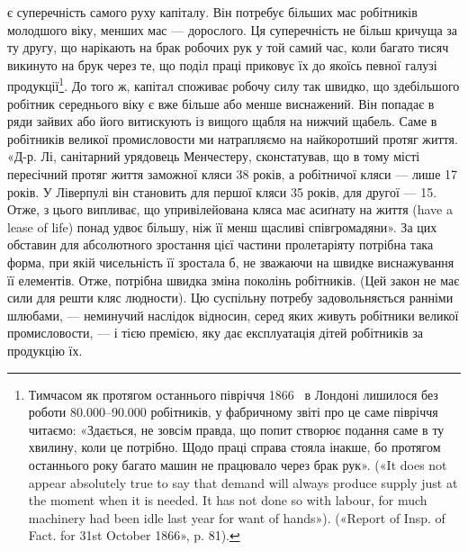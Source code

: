 \parcont{}  %
є суперечність самого руху капіталу. Він потребує більших мас робітників молодшого віку, менших мас
— дорослого. Ця суперечність не більш кричуща за ту другу, що нарікають на брак робочих рук у той
самий час, коли багато тисяч викинуто на
брук через те, що поділ праці приковує їх до якоїсь певної галузі продукції\footnote{
Тимчасом як протягом останнього півріччя 1866~ в Лондоні лишилося без роботи \num{80.000}--\num{90.000}
робітників, у фабричному звіті про це саме півріччя читаємо: «Здається, не зовсім правда, що попит
створює подання саме в ту хвилину, коли це потрібно. Щодо праці справа стояла інакше, бо протягом
останнього року багато машин не працювало через брак рук». («It does not appear absolutely true to
say that demand
will always produce supply just at the moment when it is needed. It has not done so with labour, for
much machinery had been idle last year for want of hands»). («Report of Insp. of Fact. for 31st
October 1866», p. 81).
}. До того ж, капітал
споживає робочу силу так швидко, що здебільшого робітник середнього віку є вже більше або менше
виснажений. Він попадає в ряди зайвих або його витискують
із вищого щабля на нижчий щабель. Саме в робітників великої промисловости ми натрапляємо на
найкоротший протяг життя. «Д-р. Лі, санітарний урядовець Менчестеру, сконстатував, що в тому місті
пересічний протяг життя заможної кляси
38 років, а робітничої кляси — лише 17 років. У Ліверпулі він становить для першої кляси 35 років,
для другої — 15. Отже, з цього випливає, що упривілейована кляса має асиґнату на життя (have a lease
of life) понад удвоє більшу, ніж її менш щасливі співгромадяни». За цих обставин для абсолютного
зростання цієї частини пролетаріяту потрібна така форма, при якій чисельність її зростала б, не
зважаючи на швидке виснажування її елементів. Отже, потрібна швидка зміна поколінь робітників.
(Цей закон не має сили для решти кляс людности).
Цю суспільну потребу задовольняється ранніми шлюбами, — неминучий наслідок відносин, серед яких
живуть робітники великої промисловости, — і тією премією, яку дає експлуатація дітей робітників за
продукцію їх.

